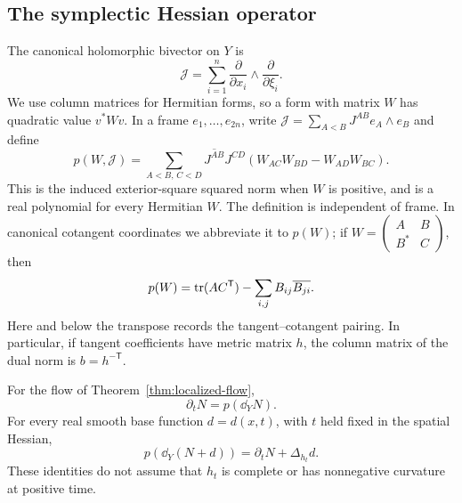 \subsection{The symplectic Hessian operator}

The canonical holomorphic bivector on $Y$ is
\[
 \mathcal J=\sum_{i=1}^n
       \frac{\partial}{\partial x_i}\wedge
       \frac{\partial}{\partial\xi_i}.
\]
We use column matrices for Hermitian forms, so a form with matrix $W$
has quadratic value $v^*Wv$.  In a frame $e_1,\ldots,e_{2n}$, write
$\mathcal J=\sum_{A<B}J^{AB}e_A\wedge e_B$ and define
\begin{equation}\label{disc:p-definition}
 p(W,\mathcal J)=
 \sum_{A<B,\,C<D}\overline{J^{AB}}J^{CD}
       (W_{AC}W_{BD}-W_{AD}W_{BC}).
\end{equation}
This is the induced exterior-square squared norm when $W$ is positive,
and is a real polynomial for every Hermitian $W$.  The definition is
independent of frame.  In canonical cotangent coordinates we abbreviate
it to $p(W)$; if
$W=\left(\begin{smallmatrix}A&B\\B^*&C\end{smallmatrix}\right)$, then
\begin{equation}\label{disc:p-block}
 p(W)=\operatorname{tr}(AC^{\mathsf T})-
                 \sum_{i,j}B_{ij}\overline{B_{ji}}.
\end{equation}
Here and below the transpose records the tangent--cotangent pairing.
In particular, if tangent coefficients have metric matrix $h$, the
column matrix of the dual norm is $b=h^{-\mathsf T}$.

\begin{lemma}\label{lem:symplectic-evolution}
For the flow of Theorem~\ref{thm:localized-flow},
\begin{equation}\label{disc:symplectic-evolution}
 \partial_tN=p(\dd_YN).
\end{equation}
For every real smooth base function $d=d(x,t)$, with $t$ held fixed in
the spatial Hessian,
\begin{equation}\label{disc:base-addition}
 p(\dd_Y(N+d))=\partial_tN+\Delta_{h_t}d.
\end{equation}
These identities do not assume that $h_t$ is complete or has
nonnegative curvature at positive time.
\end{lemma}

